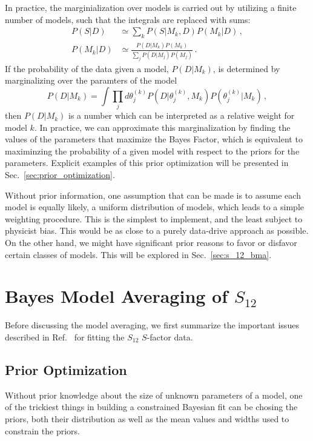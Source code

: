 \documentclass[prd,10pt,superscriptaddress,notitlepage,tightenlines,nofootinbib,floatfix]{revtex4-1}
\begin{document}
In practice, the marginialization over models is carried out by utilizing a finite number of models, such that the integrals are replaced with sums:
\begin{align}
P(S|D) &\simeq \sum_k P(S|M_k, D) P(M_k|D)\, ,
\nonumber\\
P(M_k|D) &\simeq \frac{P(D|M_k) P(M_k)}{\sum_j P(D|M_j) P(M_j)}\, .
\end{align}
If the probability of the data given a model, $P(D|M_k)$, is determined by marginalizing over the paramters of the model
\begin{equation}
P(D|M_k) = \int \prod_j d\theta_j^{(k)} P(D|\theta_j^{(k)}, M_k) P(\theta_j^{(k)}|M_k)\, ,
\end{equation}
then $P(D|M_k)$ is a number which can be interpreted as a relative weight for model $k$.
In practice, we can approximate this marginalization by finding the values of the parameters that maximize the Bayes Factor, which is equivalent to maximinzing the probability of a given model with respect to the priors for the parameters.  Explicit examples of this prior optimization will be presented in Sec.~\ref{sec:prior_optimization}.

Without prior information, one assumption that can be made is to assume each model is equally likely, a uniform distribution of models, which leads to a simple weighting procedure.  This is the simplest to implement, and the least subject to physicist bias.  This would be as close to a purely data-drive approach as possible.  On the other hand, we might have significant prior reasons to favor or disfavor certain classes of models.  This will be explored in Sec.~\ref{sec:s_12_bma}.


\section{Bayes Model Averaging of $S_{12}$ \label{sec:S_12_bma}}

Before discussing the model averaging, we first summarize the important issues described in Ref.~\cite{Moscoso:2021xog} for fitting the $S_{12}$ $S$-factor data.


\subsection{Prior Optimization \label{sec:prior_optimization}}

Without prior knowledge about the size of unknown parameters of a model, one of the trickiest things in building a constrained Bayesian fit can be chosing the priors, both their distribution as well as the mean values and widths used to constrain the priors.
\end{document}
